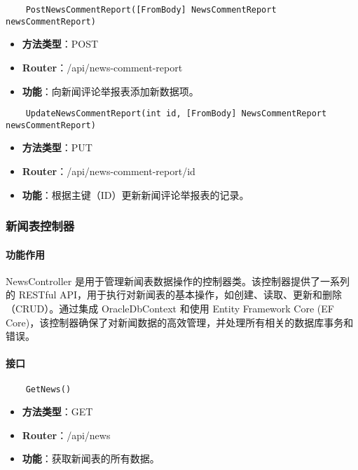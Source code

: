\begin{verbatim}
	PostNewsCommentReport([FromBody] NewsCommentReport newsCommentReport)
\end{verbatim}

\begin{itemize}
	\item \textbf{方法类型}：POST
	\item \textbf{Router}：/api/news-comment-report
	\item \textbf{功能}：向新闻评论举报表添加新数据项。
\end{itemize}

\begin{verbatim}
	UpdateNewsCommentReport(int id, [FromBody] NewsCommentReport newsCommentReport)
\end{verbatim}

\begin{itemize}
	\item \textbf{方法类型}：PUT
	\item \textbf{Router}：/api/news-comment-report/{id}
	\item \textbf{功能}：根据主键（ID）更新新闻评论举报表的记录。
\end{itemize}

\subsubsection{新闻表控制器}

\paragraph{功能作用}

NewsController 是用于管理新闻表数据操作的控制器类。该控制器提供了一系列的 RESTful API，用于执行对新闻表的基本操作，如创建、读取、更新和删除（CRUD）。通过集成 OracleDbContext 和使用 Entity Framework Core (EF Core)，该控制器确保了对新闻数据的高效管理，并处理所有相关的数据库事务和错误。

\paragraph{接口}

\begin{verbatim}
	GetNews()
\end{verbatim}

\begin{itemize}
	\item \textbf{方法类型}：GET
	\item \textbf{Router}：/api/news
	\item \textbf{功能}：获取新闻表的所有数据。
\end{itemize}

